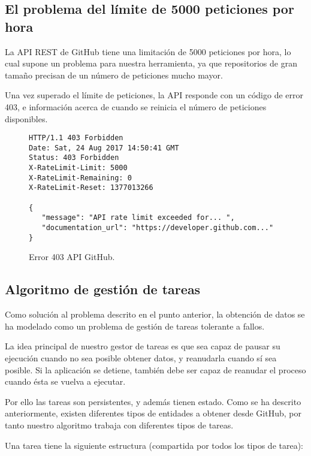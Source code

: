 \subsection{El problema del límite de 5000 peticiones por hora}

La API REST de GitHub tiene una limitación de 5000 peticiones por hora, lo cual supone un problema para nuestra herramienta, ya que repositorios de gran tamaño precisan de un número de peticiones mucho mayor.

Una vez superado el límite de peticiones, la API responde con un código de error 403, e información acerca de cuando se reinicia el número de peticiones disponibles.

\begin{figure}[H]
\begin{verbatim}
HTTP/1.1 403 Forbidden
Date: Sat, 24 Aug 2017 14:50:41 GMT
Status: 403 Forbidden
X-RateLimit-Limit: 5000
X-RateLimit-Remaining: 0
X-RateLimit-Reset: 1377013266

{
   "message": "API rate limit exceeded for... ",
   "documentation_url": "https://developer.github.com..."
}
\end{verbatim}
\caption{Error 403 API GitHub.} 
\label{error-403}
\end{figure}

\subsection{Algoritmo de gestión de tareas}

Como solución al problema descrito en el punto anterior, la obtención de datos se ha modelado como un problema de gestión de tareas tolerante a fallos.

La idea principal de nuestro gestor de tareas es que sea capaz de pausar su ejecución cuando no sea posible obtener datos, y reanudarla cuando sí sea posible. Si la aplicación se detiene, también debe ser capaz de reanudar el proceso cuando ésta se vuelva a ejecutar.

Por ello las tareas son persistentes, y además tienen estado. Como se ha descrito anteriormente, existen diferentes tipos de entidades a obtener desde GitHub, por tanto nuestro algoritmo trabaja con diferentes tipos de tareas.

Una tarea tiene la siguiente estructura (compartida por todos los tipos de tarea):

